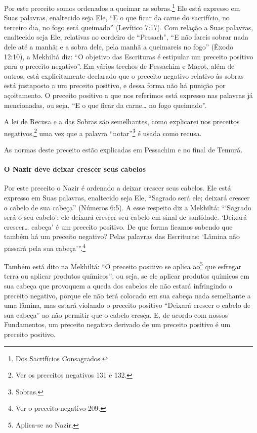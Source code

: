 Por este preceito somos ordenados a queimar as
sobras.\footnote{Dos Sacrifícios Consagrados.} Ele está expresso em Suas palavras,
enaltecido seja Ele, ``E o que ficar da carne do sacrifício, no terceiro dia, no fogo será queimado'' (Levítico 7:17). Com
relação a Suas palavras, enaltecido seja Ele, relativas ao cordeiro de
``Pessach'', ``E não fareis sobrar nada dele até a manhã; e a sobra
dele, pela manhã a queimareis no fogo'' (Êxodo 12:10), a Mekhiltá diz:
``O objetivo das Escrituras é estipular um preceito positivo para o
preceito negativo''. Em vários trechos de Pessachim e Macot, além de
outros, está explicitamente declarado que o preceito negativo relativo
às sobras está justaposto a um preceito positivo, e dessa forma não há
punição por açoitamento. O preceito positivo a que nos referimos está
expresso nas palavras já mencionadas, ou seja, ``E o que ficar da
carne\ldots{} no fogo queimado''.

A lei de Recusa e a das Sobras são semelhantes, como explicarei
nos preceitos negativos,\footnote{Ver os preceitos negativos 131 e 132.} uma vez que a palavra ``notar''\footnote{Sobras.} é usada como recusa.

As normas deste preceito estão explicadas em Pessachim e no final de Temurá.

\paragraph{O Nazir deve deixar crescer seus cabelos}

Por este preceito o Nazir é ordenado a deixar crescer seus cabelos. Ele
está expresso em Suas palavras, enaltecido seja Ele, ``Sagrado será ele;
deixará crescer o cabelo de sua cabeça'' (Números 6:5). A esse respeito
diz a Mekhiltá: ```Sagrado será o seu cabelo': ele deixará crescer seu
cabelo em sinal de santidade. `Deixará crescer\ldots{} cabeça' é um preceito
positivo. De que forma ficamos sabendo que também há um preceito
negativo? Pelas palavras das Escrituras: `Lâmina não passará pela sua
cabeça'''.\footnote{Ver o preceito negativo 209.}

Também está dito na Mekhiltá: ``O preceito positivo se aplica
ao\footnote{Aplica-se ao Nazir.} que esfregar terra ou aplicar produtos
químicos''; ou seja, se ele aplicar produtos químicos em sua cabeça que provoquem a queda dos cabelos ele não
estará infringindo o preceito negativo, porque ele não terá colocado em
sua cabeça nada semelhante a uma lâmina, mas estará violando o preceito
positivo ``Deixará crescer o cabelo de sua cabeça'' ao não permitir que
o cabelo cresça. E, de acordo com nossos Fundamentos, um preceito
negativo derivado de um preceito positivo é um preceito positivo.

